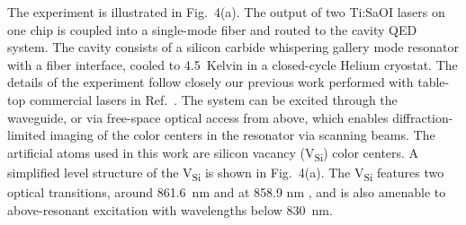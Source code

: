 \documentclass[amsmath, amsthm, amssymb, aps, prb, superscriptaddress, twocolumn, nofootinbib, 10pt]{revtex4-1}%
\begin{document}
The experiment is illustrated in Fig.~4(a). The output of two Ti:SaOI lasers on one chip is coupled into a single-mode fiber and routed to the cavity QED system. The cavity consists of a silicon carbide whispering gallery mode resonator \cite{lukin2023multiemitter} with a fiber interface\cite{catanzaro2023cryogenic}, cooled to 4.5~Kelvin in a closed-cycle Helium cryostat. The details of the experiment follow closely our previous work performed with table-top commercial lasers in Ref.~\cite{lukin2023two}. The system can be excited through the waveguide, or via free-space optical access from above, which enables diffraction-limited imaging of the color centers in the resonator via scanning beams. The artificial atoms used in this work are silicon vacancy (V\textsubscript{Si}) color centers. A simplified level structure of the V\textsubscript{Si} is shown in Fig.~4(a). The V\textsubscript{Si} features two optical transitions, around 861.6~nm and at 858.9 nm \cite{nagy2018quantum}, and is also amenable to above-resonant excitation with wavelengths below 830~nm. 
\end{document}
